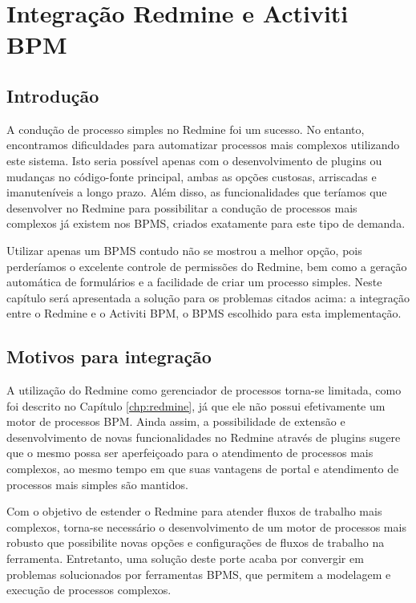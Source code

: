 \chapter{Integração Redmine e Activiti BPM}\label{chp:integracao_redmine_activiti}

\section{Introdução}\label{sec:integracao_intro}

A condução de processo simples no Redmine foi um sucesso. No entanto, encontramos dificuldades para automatizar processos mais complexos utilizando este sistema. Isto seria possível apenas com o desenvolvimento de plugins ou mudanças no código-fonte principal, ambas as opções custosas, arriscadas e imanuteníveis a longo prazo. Além disso, as funcionalidades que teríamos que desenvolver no Redmine para possibilitar a condução de processos mais complexos já existem nos BPMS, criados exatamente para este tipo de demanda. 

Utilizar apenas um BPMS contudo não se mostrou a melhor opção, pois perderíamos o excelente controle de permissões do Redmine, bem como a geração automática de formulários e a facilidade de criar um processo simples. 
Neste capítulo será apresentada a solução para os problemas citados acima: a integração entre o Redmine e o Activiti BPM, o BPMS escolhido para esta implementação.

\section{Motivos para integração}\label{sec:cenario-integracao}

A utilização do Redmine como gerenciador de processos torna-se limitada, como foi descrito no Capítulo \ref{chp:redmine}, já que ele não possui efetivamente um motor de processos BPM. Ainda assim, a possibilidade de extensão e desenvolvimento de novas funcionalidades no Redmine através de plugins sugere que o mesmo possa ser aperfeiçoado para o atendimento de processos mais complexos, ao mesmo tempo em que suas vantagens de portal e atendimento de processos mais simples são mantidos.

Com o objetivo de estender o Redmine para atender fluxos de trabalho mais complexos, torna-se necessário o desenvolvimento de um motor de processos mais robusto que possibilite novas opções e configurações de fluxos de trabalho na ferramenta. Entretanto, uma solução deste porte acaba por convergir em problemas solucionados por ferramentas BPMS, que permitem a modelagem e execução de processos complexos.

